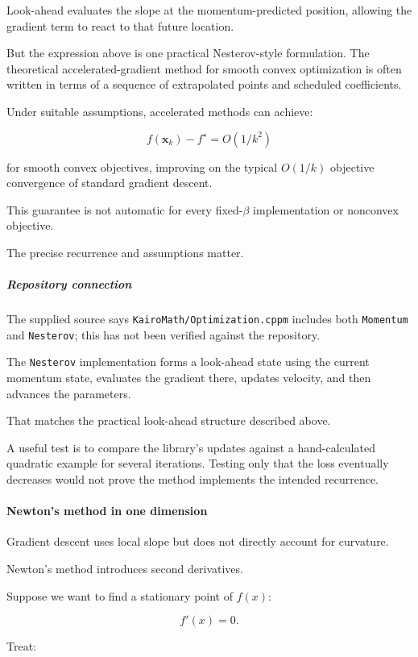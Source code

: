 Look-ahead evaluates the slope at the momentum-predicted position, allowing the gradient term to react to that future location.

But the expression above is one practical Nesterov-style formulation. The theoretical accelerated-gradient method for smooth convex optimization is often written in terms of a sequence of extrapolated points and scheduled coefficients.

Under suitable assumptions, accelerated methods can achieve:

\[
f(\mathbf x_k)-f^\star=O(1/k^2)
\]

for smooth convex objectives, improving on the typical \(O(1/k)\) objective convergence of standard gradient descent.

This guarantee is not automatic for every fixed-\(\beta\) implementation or nonconvex objective.

The precise recurrence and assumptions matter.

\subparagraph{Repository connection}\label{repository-connection}

The supplied source says \texttt{KairoMath/Optimization.cppm} includes both \texttt{Momentum} and \texttt{Nesterov}; this has not been verified against the repository.

The \texttt{Nesterov} implementation forms a look-ahead state using the current momentum state, evaluates the gradient there, updates velocity, and then advances the parameters.

That matches the practical look-ahead structure described above.

A useful test is to compare the library's updates against a hand-calculated quadratic example for several iterations. Testing only that the loss eventually decreases would not prove the method implements the intended recurrence.

\paragraph{Newton's method in one dimension}\label{newtons-method-in-one-dimension}

Gradient descent uses local slope but does not directly account for curvature.

Newton's method introduces second derivatives.

Suppose we want to find a stationary point of \(f(x)\):

\[
f'(x)=0.
\]

Treat:

